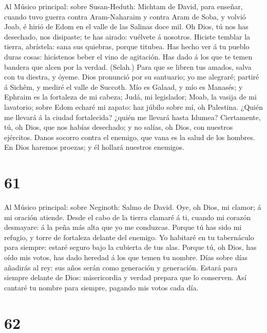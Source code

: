  Al Músico principal: sobre Susan-Heduth: Michtam de
David, para enseñar, cuando tuvo guerra contra Aram-Naharaim y contra
Aram de Soba, y volvió Joab, é hirió de Edom en el valle de las Salinas
doce mil. Oh Dios, tú nos has desechado, nos disipaste; te has airado:
vuélvete á nosotros.  Hiciste temblar la tierra,
abrístela: sana sus quiebras, porque titubea.  Has hecho
ver á tu pueblo duras cosas: hicístenos beber el vino de agitación.
 Has dado á los que te temen bandera que alcen por la
verdad. (Selah.)  Para que se libren tus amados, salva con
tu diestra, y óyeme.  Dios pronunció por su santuario; yo
me alegraré; partiré á Sichêm, y mediré el valle de Succoth.
 Mío es Galaad, y mío es Manasés; y Ephraim es la
fortaleza de mi cabeza; Judá, mi legislador;  Moab, la
vasija de mi lavatorio; sobre Edom echaré mi zapato: haz júbilo sobre
mí, oh Palestina.  ¿Quién me llevará á la ciudad
fortalecida? ¿quién me llevará hasta Idumea? 
Ciertamente, tú, oh Dios, que nos habías desechado; y no salías, oh
Dios, con nuestros ejércitos.  Danos socorro contra el
enemigo, que vana es la salud de los hombres.  En Dios
haremos proezas; y él hollará nuestros enemigos.

\hypertarget{section-60}{%
\section{61}\label{section-60}}

 Al Músico principal: sobre Neginoth: Salmo de David. Oye,
oh Dios, mi clamor; á mi oración atiende.  Desde el cabo
de la tierra clamaré á ti, cuando mi corazón desmayare: á la peña más
alta que yo me conduzcas.  Porque tú has sido mi refugio,
y torre de fortaleza delante del enemigo.  Yo habitaré en
tu tabernáculo para siempre: estaré seguro bajo la cubierta de tus alas.
 Porque tú, oh Dios, has oído mis votos, has dado heredad
á los que temen tu nombre.  Días sobre días añadirás al
rey: sus años serán como generación y generación.  Estará
para siempre delante de Dios: misericordia y verdad prepara que lo
conserven.  Así cantaré tu nombre para siempre, pagando
mis votos cada día.

\hypertarget{section-61}{%
\section{62}\label{section-61}}

